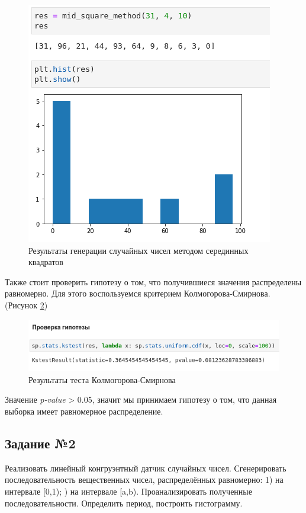 \documentclass[14pt,fleqn]{extarticle}
\begin{document}
    \begin{figure}[h]
        \centering \includegraphics[scale=0.8]{mid_square_method_result}
        \caption{Результаты генерации случайных чисел методом серединных квадратов}
        \label{fig:mid_square_method_result}
    \end{figure}

	Также стоит проверить гипотезу о том, что получившиеся значения распределены равномерно. Для этого воспользуемся критерием Колмогорова-Смирнова. (Рисунок \ref{fig:mid_square_method_test})
 	\begin{figure}[h]
		\centering \includegraphics[scale=0.6]{mid_square_method_test}
		\caption{Результаты теста Колмогорова-Смирнова}
		\label{fig:mid_square_method_test}
	\end{figure}
	
	Значение \textit{p-value} > 0.05, значит мы принимаем гипотезу о том, что данная выборка имеет равномерное распределение.

	\newpage
    
    \subsection*{Задание №2}
    Реализовать линейный конгруэнтный датчик случайных чисел. Сгенерировать последовательность вещественных чисел, распределённых равномерно: 1) на интервале [0,1); ) на интервале [a,b). Проанализировать полученные последовательности. Определить период, построить гистограмму.\\
    \newline
\end{document}
